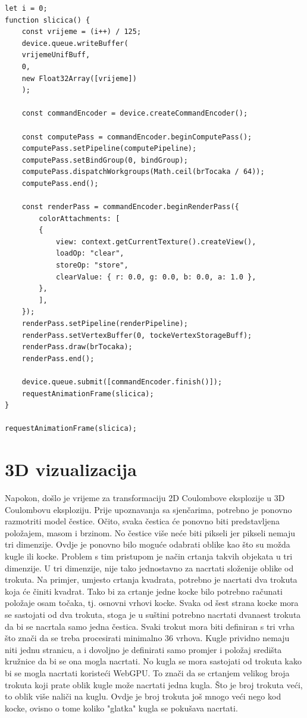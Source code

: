 \documentclass{foi}
\begin{document}
\begin{verbatim}
let i = 0;
function slicica() {
	const vrijeme = (i++) / 125;
	device.queue.writeBuffer(
	vrijemeUnifBuff,
	0,
	new Float32Array([vrijeme])
	);
	
	const commandEncoder = device.createCommandEncoder();
	
	const computePass = commandEncoder.beginComputePass();
	computePass.setPipeline(computePipeline);
	computePass.setBindGroup(0, bindGroup);
	computePass.dispatchWorkgroups(Math.ceil(brTocaka / 64));
	computePass.end();
	
	const renderPass = commandEncoder.beginRenderPass({
		colorAttachments: [
		{
			view: context.getCurrentTexture().createView(),
			loadOp: "clear",
			storeOp: "store",
			clearValue: { r: 0.0, g: 0.0, b: 0.0, a: 1.0 },
		},
		],
	});
	renderPass.setPipeline(renderPipeline);
	renderPass.setVertexBuffer(0, tockeVertexStorageBuff);
	renderPass.draw(brTocaka);
	renderPass.end();
	
	device.queue.submit([commandEncoder.finish()]);
	requestAnimationFrame(slicica);
}

requestAnimationFrame(slicica);
\end{verbatim}




\chapter{3D vizualizacija} 
Napokon, došlo je vrijeme za transformaciju 2D Coulombove eksplozije u 3D Coulombovu eksploziju. Prije upoznavanja sa sjenčarima, potrebno je ponovno razmotriti model čestice. Očito, svaka čestica će ponovno biti predstavljena položajem, masom i brzinom. No čestice više neće biti pikseli jer pikseli nemaju tri dimenzije. Ovdje je ponovno bilo moguće odabrati oblike kao što su možda kugle ili kocke. Problem s tim pristupom je način crtanja takvih objekata u tri dimenzije. U tri dimenzije, nije tako jednostavno za nacrtati složenije oblike od trokuta. Na primjer, umjesto crtanja kvadrata, potrebno je nacrtati dva trokuta koja će činiti kvadrat. Tako bi za crtanje jedne kocke bilo potrebno računati položaje osam točaka, tj. osnovni vrhovi kocke. Svaka od šest strana kocke mora se sastojati od dva trokuta, stoga je u suštini potrebno nacrtati dvanaest trokuta da bi se nacrtala samo jedna čestica. Svaki trokut mora biti definiran s tri vrha što znači da se treba procesirati minimalno 36 vrhova. Kugle prividno nemaju niti jednu stranicu, a i dovoljno je definirati samo promjer i položaj središta kružnice da bi se ona mogla nacrtati. No kugla se mora sastojati od trokuta kako bi se mogla nacrtati koristeći WebGPU. To znači da se crtanjem velikog broja trokuta koji prate oblik kugle može nacrtati jedna kugla. Što je broj trokuta veći, to oblik više naliči na kuglu. Ovdje je broj trokuta još mnogo veći nego kod kocke, ovisno o tome koliko "glatka" kugla se pokušava nacrtati. 
\end{document}

